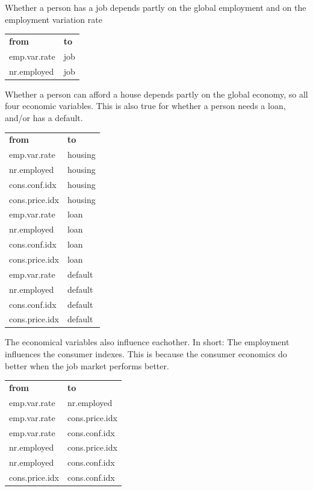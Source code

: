 \documentclass[11pt]{article}
\begin{document}
\begin{multicols}{2}
Whether a person has a job depends partly on the global employment and on the
employment variation rate

\medskip
\begin{tabular}{ll}
    \textbf{from} & \textbf{to} \\
    emp.var.rate & job\\
    nr.employed & job 
\end{tabular}

\medskip
Whether a person can afford a house depends partly on the global economy, so all
four economic variables. This is also true for whether a person needs a loan,
and/or has a default. 

\bigskip
\begin{tabular}{ll}
    \textbf{from} & \textbf{to} \\
    emp.var.rate & housing \\
    nr.employed & housing \\ 
    cons.conf.idx & housing \\ 
    cons.price.idx & housing \\ 
    \medskip
    emp.var.rate & loan \\
    nr.employed & loan \\ 
    cons.conf.idx & loan \\ 
    cons.price.idx & loan \\
    \medskip
    emp.var.rate & default \\
    nr.employed & default \\ 
    cons.conf.idx & default \\ 
    cons.price.idx & default \\ 
\end{tabular}

\bigskip
The economical variables also influence eachother. In short: The employment
influences the consumer indexes. This is because the consumer economics do
better when the job market performs better. 

\medskip
\begin{tabular}{ll}
    \textbf{from} & \textbf{to} \\
    emp.var.rate & nr.employed \\
    emp.var.rate & cons.price.idx \\
    emp.var.rate & cons.conf.idx \\
    nr.employed & cons.price.idx \\ 
    nr.employed & cons.conf.idx \\ 
    cons.price.idx & cons.conf.idx \\ 
\end{tabular}



\end{multicols}
\end{document}
